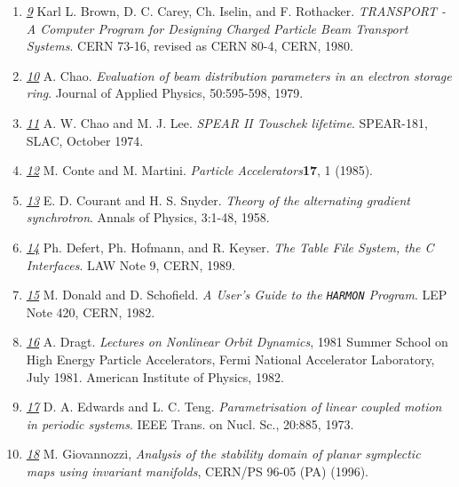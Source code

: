 \begin{enumerate}
   \item \href{transport}{\textit{9}} Karl L. Brown, D. C. Carey,
     Ch. Iselin, and F. Rothacker. \textit{TRANSPORT - A Computer
       Program for Designing Charged   Particle Beam Transport
       Systems}. CERN 73-16, revised as CERN 80-4, CERN, 1980.  


   \item \href{chao}{\textit{10}} A. Chao. \textit{Evaluation of beam
     distribution parameters in an electron   storage ring}. Journal of
     Applied Physics, 50:595-598, 1979.  


   \item \href{chao1}{\textit{11}} A. W. Chao and
     M. J. Lee. \textit{SPEAR II Touschek lifetime}. SPEAR-181, SLAC,
     October 1974.  


   \item \href{conte}{\textit{12}} M. Conte and
     M. Martini. \textit{Particle Accelerators}\textbf{17}, 1 (1985).  


   \item \href{courant}{\textit{13}} E. D. Courant and
     H. S. Snyder. \textit{Theory of the alternating gradient
       synchrotron}. Annals of Physics, 3:1-48, 1958.  


   \item \href{tfs}{\textit{14}} Ph. Defert, Ph. Hofmann, and
     R. Keyser. \textit{The Table File System, the C Interfaces}. LAW
     Note 9, CERN, 1989.  


   \item \href{donald}{\textit{15}} M. Donald and
     D. Schofield. \textit{A User's Guide to the \texttt{HARMON}
       Program}. LEP Note 420, CERN, 1982.  


   \item \href{dragt}{\textit{16}} A. Dragt. \textit{Lectures on
     Nonlinear Orbit Dynamics}, 1981 Summer School on High   Energy
     Particle Accelerators, Fermi National Accelerator Laboratory, July
     1981. American Institute of Physics, 1982.  


   \item \href{edwards}{\textit{17}} D. A. Edwards and
     L. C. Teng. \textit{Parametrisation of linear coupled motion in
       periodic systems}. IEEE Trans. on Nucl. Sc., 20:885, 1973.  


   \item \href{giovanozzi}{\textit{18}} M. Giovannozzi, \textit{Analysis
     of the stability domain of planar symplectic maps using invariant
     manifolds}, CERN/PS 96-05 (PA) (1996).  



\end{enumerate}
